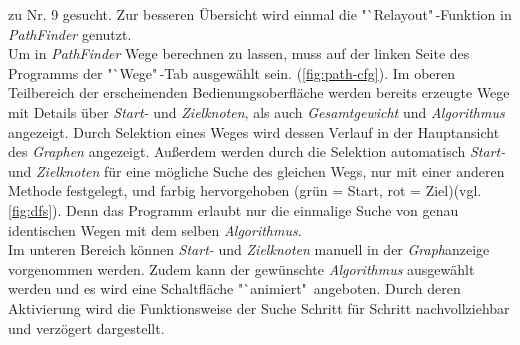 \documentclass[12pt]{article}
\begin{document}
 zu Nr. 9 gesucht. Zur besseren Übersicht wird einmal die "`Relayout"\,-Funktion in \textit{PathFinder} genutzt. 
\\
Um in \textit{PathFinder} Wege berechnen zu lassen, muss auf der linken Seite des Programms der "`Wege"\,-Tab ausgewählt sein. (\autoref{fig:path-cfg}). Im oberen Teilbereich der erscheinenden Bedienungsoberfläche werden bereits erzeugte Wege mit Details über \textit{Start-} und \textit{Zielknoten}, als auch \textit{Gesamtgewicht} und \textit{Algorithmus} angezeigt. Durch Selektion eines Weges wird dessen Verlauf in der Hauptansicht des \textit{Graphen} angezeigt. Außerdem werden durch die Selektion automatisch \textit{Start-} und \textit{Zielknoten} für eine mögliche Suche des gleichen Wegs, nur mit einer anderen Methode festgelegt, und farbig hervorgehoben (grün = Start, rot = Ziel)(vgl. \autoref{fig:dfs}). Denn das Programm erlaubt nur die einmalige Suche von genau identischen Wegen mit dem selben \textit{Algorithmus}.
\\
Im unteren Bereich können \textit{Start-} und \textit{Zielknoten} manuell in der \textit{Graph}anzeige vorgenommen werden. Zudem kann der gewünschte \textit{Algorithmus} ausgewählt werden und es wird eine Schaltfläche "`animiert"\ angeboten. Durch deren Aktivierung wird die Funktionsweise der Suche Schritt für Schritt nachvollziehbar und verzögert dargestellt.
\end{document}
